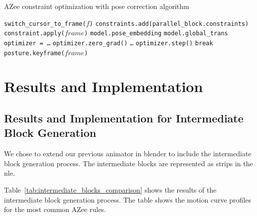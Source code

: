 \documentclass[../../main.tex]{subfiles}
\begin{document}
\begin{algorithm}
  \caption{AZee constraint optimization with pose correction algorithm}
  \label{alg:pose_correction}
  \begin{algorithmic}[1]
      \State \texttt{switch\_cursor\_to\_frame($f$)}
          \State \texttt{constraints.add(parallel\_block.constraints)}
      \EndFor
          \State \texttt{constraint.apply($frame$)}
      \EndFor
      \State \texttt{model.pose\_embedding}
      \State \texttt{model.global\_trans}
      \State \texttt{optimizer = \dots}
          \State \texttt{optimizer.zero\_grad()}
          \State \texttt{\dots}
          \State \texttt{optimizer.step()}
           \State \texttt{break} \EndIf
      \EndFor
      \State \texttt{posture.keyframe($frame$)}
  \EndFor
  \end{algorithmic}
  \end{algorithm}

\section{Results and Implementation}
\label{ch:intermediate_blocks_pose_correction:results}

\subsection{Results and Implementation for Intermediate Block Generation}
\label{ch:intermediate_blocks_pose_correction:results:intermediate_block_generation}

We chose to extend our previous animator in blender to include the intermediate block generation process. The intermediate blocks are represented as strips in the \gls{nle}.

Table~\ref{tab:intermediate_blocks_comparison} shows the results of the intermediate block generation process. The table shows the motion curve profiles for the most common AZee rules.
\end{document}
